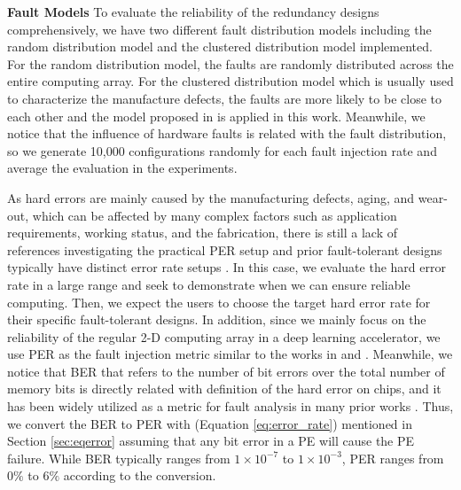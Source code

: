 \textbf{Fault Models} To evaluate the reliability of the redundancy designs comprehensively, we have two different fault distribution models including the random distribution model and the clustered distribution model implemented. For the random distribution model, the faults are randomly distributed across the entire computing array. For the clustered distribution model which is usually used to characterize the manufacture defects, the faults are more likely to be close to each other and the model proposed in \cite{meyer1989modeling} is applied in this work. Meanwhile, we notice that the influence of hardware faults is related with the fault distribution, so we generate 10,000 configurations randomly for each fault injection rate and average the evaluation in the experiments. 

As hard errors are mainly caused by the manufacturing defects, aging, and wear-out, which can be affected by many complex factors such as application requirements, working status, and the fabrication, there is still a lack of references investigating the practical PER setup and prior fault-tolerant designs typically have distinct error rate setups \cite{liu2011resilient, li2008understanding, abdullah2020salvagednn, zhang2018analyzing}. In this case, we evaluate the hard error rate in a large range and seek to demonstrate when we can ensure reliable computing. Then, we expect the users to choose the target hard error rate for their specific fault-tolerant designs. In addition, since we mainly focus on the reliability of the regular 2-D computing array in a deep learning accelerator, we use PER as the fault injection metric similar to the works in \cite{zhang2018analyzing} and \cite{qian2016optimal}. Meanwhile, we notice that BER that refers to the number of bit errors over the total number of memory bits is directly related with definition of the hard error on chips, and it has been widely utilized as a metric for fault analysis in many prior works \cite{mittal2020survey}\cite{neggaz2018reliability}\cite{ares2018dac}. Thus, we convert the BER to PER with (Equation \ref{eq:error_rate}) mentioned in Section \ref{sec:eqerror} assuming that any bit error in a PE will cause the PE failure. While BER typically ranges from $1 \times 10^{-7}$ to $1 \times 10^{-3}$, PER ranges from 0$\%$ to 6$\%$ according to the conversion.  


